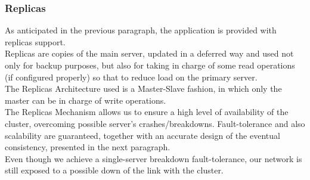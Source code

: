 \subsubsection{Replicas}
As anticipated in the previous paragraph, the application is provided with replicas support. \\
Replicas are copies of the main server, updated in a deferred way and used not only for backup purposes, but also for taking in charge of some read operations (if configured properly) so that to reduce load on the primary server. \\
The Replicas Architecture used is a Master-Slave fashion, in which only the master can be in charge of write operations.\\
The Replicas Mechanism allows us to ensure a high level of availability of the cluster, overcoming possible server’s crashes/breakdowns. Fault-tolerance and also scalability are guaranteed, together with an accurate design of the eventual consistency, presented in the next paragraph. \\
Even though we achieve a single-server breakdown fault-tolerance, our network is still exposed to a possible down of the link with the cluster.

